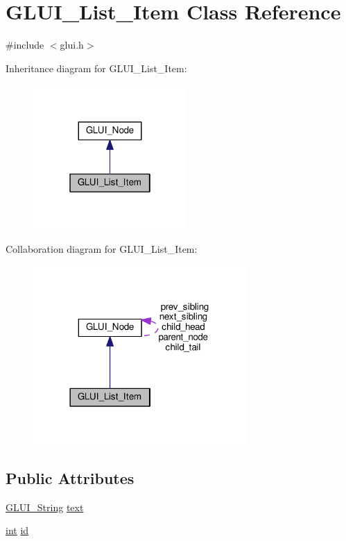 \hypertarget{class_g_l_u_i___list___item}{\section{G\+L\+U\+I\+\_\+\+List\+\_\+\+Item Class Reference}
\label{class_g_l_u_i___list___item}
}


{\ttfamily \#include $<$glui.\+h$>$}



Inheritance diagram for G\+L\+U\+I\+\_\+\+List\+\_\+\+Item\+:\nopagebreak
\begin{figure}[H]
\begin{center}
\leavevmode
\includegraphics[width=166pt]{class_g_l_u_i___list___item__inherit__graph}
\end{center}
\end{figure}


Collaboration diagram for G\+L\+U\+I\+\_\+\+List\+\_\+\+Item\+:\nopagebreak
\begin{figure}[H]
\begin{center}
\leavevmode
\includegraphics[width=230pt]{class_g_l_u_i___list___item__coll__graph}
\end{center}
\end{figure}
\subsection*{Public Attributes}
\begin{DoxyCompactItemize}
\item 
\hyperlink{glui_8h_aada824856f7bcf29794719981ebd8f60}{G\+L\+U\+I\+\_\+\+String} \hyperlink{class_g_l_u_i___list___item_a8d7db7c4b7dd085352de5d1a6b849da2}{text}
\item 
\hyperlink{wglext_8h_a500a82aecba06f4550f6849b8099ca21}{int} \hyperlink{class_g_l_u_i___list___item_a329b7a460a0e449e4bb0bdc2e8ba519c}{id}
\end{DoxyCompactItemize}
